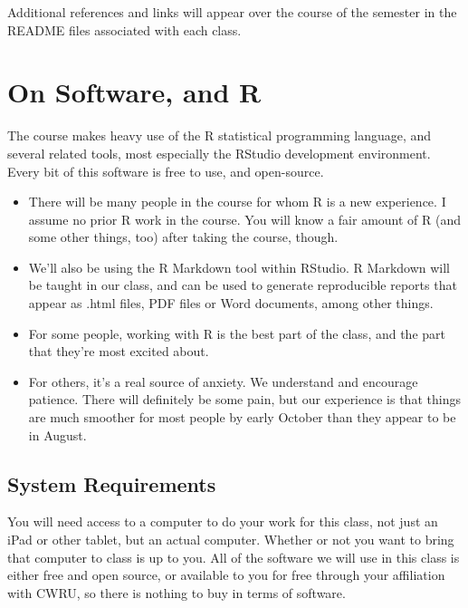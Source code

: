 \documentclass[
]{book}
\providecommand{\tightlist}{%
  \setlength{\itemsep}{0pt}\setlength{\parskip}{0pt}}
\begin{document}
Additional references and links will appear over the course of the semester in the README files associated with each class.

\hypertarget{on-software-and-r}{%
\chapter{On Software, and R}\label{on-software-and-r}}

The course makes heavy use of the R statistical programming language, and several related tools, most especially the RStudio development environment. Every bit of this software is free to use, and open-source.

\begin{itemize}
\tightlist
\item
  There will be many people in the course for whom R is a new experience. I assume no prior R work in the course. You will know a fair amount of R (and some other things, too) after taking the course, though.
\item
  We'll also be using the R Markdown tool within RStudio. R Markdown will be taught in our class, and can be used to generate reproducible reports that appear as .html files, PDF files or Word documents, among other things.
\item
  For some people, working with R is the best part of the class, and the part that they're most excited about.
\item
  For others, it's a real source of anxiety. We understand and encourage patience. There will definitely be some pain, but our experience is that things are much smoother for most people by early October than they appear to be in August.
\end{itemize}

\hypertarget{system-requirements}{%
\section{System Requirements}\label{system-requirements}}

You will need access to a computer to do your work for this class, not just an iPad or other tablet, but an actual computer. Whether or not you want to bring that computer to class is up to you. All of the software we will use in this class is either free and open source, or available to you for free through your affiliation with CWRU, so there is nothing to buy in terms of software.
\end{document}
